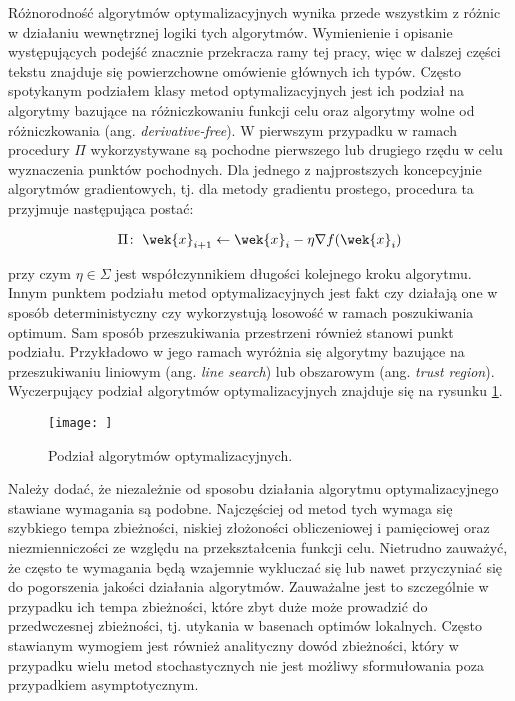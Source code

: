 Różnorodność algorytmów optymalizacyjnych wynika przede wszystkim z różnic w działaniu wewnętrznej logiki tych algorytmów. Wymienienie i opisanie występujących podejść znacznie przekracza ramy tej pracy, więc w dalszej części tekstu znajduje się powierzchowne omówienie głównych ich typów.
Często spotykanym podziałem klasy metod optymalizacyjnych jest ich podział na algorytmy bazujące na różniczkowaniu funkcji celu oraz algorytmy wolne od różniczkowania (ang. \textit{derivative-free}). W pierwszym przypadku w ramach procedury $\Pi$ wykorzystywane są pochodne pierwszego lub drugiego rzędu w celu wyznaczenia punktów pochodnych. Dla jednego z najprostszych koncepcyjnie algorytmów gradientowych, tj. dla metody gradientu prostego, procedura ta przyjmuje następująca postać:

\begin{equation*}
    \Pi\colon\; \wek{x}_{i+1} \leftarrow \wek{x}_{i} - \eta \nabla f(\wek{x}_{i})
\end{equation*}

przy czym $\eta \in \Sigma$ jest współczynnikiem długości kolejnego kroku algorytmu. Innym punktem podziału metod optymalizacyjnych jest fakt czy działają one w sposób deterministyczny czy wykorzystują losowość w ramach poszukiwania optimum. Sam sposób przeszukiwania przestrzeni również stanowi punkt podziału. Przykładowo w jego ramach wyróżnia się algorytmy bazujące na przeszukiwaniu liniowym (ang. \textit{line search}) lub obszarowym (ang. \textit{trust region}). 
Wyczerpujący podział algorytmów optymalizacyjnych znajduje się na rysunku \ref{fig:alg-task}.

\begin{figure}
    \centering
    \texttt{[image: ]}
    \caption{Podział algorytmów optymalizacyjnych.}
    \label{fig:alg-task}
\end{figure}

Należy dodać, że niezależnie od sposobu działania algorytmu optymalizacyjnego stawiane wymagania są podobne. Najczęściej od metod tych wymaga się szybkiego tempa zbieżności, niskiej złożoności obliczeniowej i pamięciowej oraz niezmienniczości ze względu na przekształcenia funkcji celu. Nietrudno zauważyć, że często te wymagania będą wzajemnie wykluczać się lub nawet przyczyniać się do pogorszenia jakości działania algorytmów. Zauważalne jest to szczególnie w przypadku ich tempa zbieżności, które zbyt duże może prowadzić do przedwczesnej zbieżności, tj. utykania w basenach optimów lokalnych. Często stawianym wymogiem jest również analityczny dowód zbieżności, który w przypadku wielu metod stochastycznych nie jest możliwy sformułowania poza przypadkiem asymptotycznym. 
